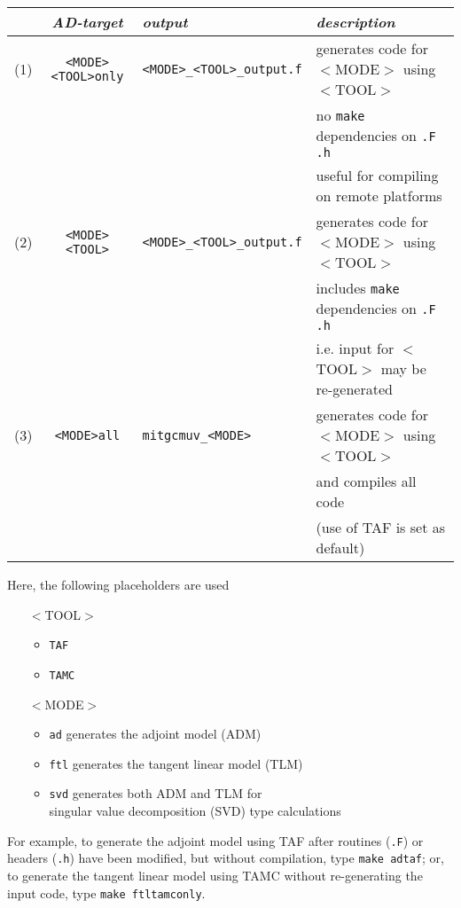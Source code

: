 \begin{table}[h!]
{\footnotesize
\begin{tabular}{ccll}
~ & {\it AD-target} & {\it output} & {\it description} \\
\hline
\hline
(1) & {\tt <MODE><TOOL>only} & {\tt <MODE>\_<TOOL>\_output.f}  & 
generates code for $<$MODE$>$ using $<$TOOL$>$ \\
~ & ~ & ~ & no {\tt make} dependencies on {\tt .F .h} \\
~ & ~ & ~ & useful for compiling on remote platforms \\
\hline
(2) & {\tt <MODE><TOOL>} & {\tt <MODE>\_<TOOL>\_output.f}  & 
generates code for $<$MODE$>$ using $<$TOOL$>$ \\
~ & ~ & ~ & includes {\tt make} dependencies on {\tt .F .h} \\
~ & ~ & ~ & i.e. input for $<$TOOL$>$ may be re-generated \\
\hline
(3) & {\tt <MODE>all} & {\tt mitgcmuv\_<MODE>}  & 
generates code for $<$MODE$>$ using $<$TOOL$>$ \\
~ & ~ & ~ & and compiles all code \\
~ & ~ & ~ & (use of TAF is set as default) \\
\hline
\hline
\end{tabular}
}
\end{table}
%
Here, the following placeholders are used
%
\begin{itemize}
%
\item [$<$TOOL$>$]
%
\begin{itemize}
%
\item {\tt TAF}
\item {\tt TAMC}
%
\end{itemize}
%
\item [$<$MODE$>$]
%
\begin{itemize}
%
\item {\tt ad} generates the adjoint model (ADM)
\item {\tt ftl} generates the tangent linear model (TLM)
\item {\tt svd} generates both ADM and TLM for \\
singular value decomposition (SVD) type calculations
%
\end{itemize}
%
\end{itemize}

For example, to generate the adjoint model using TAF after routines ({\tt .F})
or headers ({\tt .h}) have been modified, but without compilation,
type {\tt make adtaf};
or, to generate the tangent linear model using TAMC without
re-generating the input code, type {\tt make ftltamconly}.


